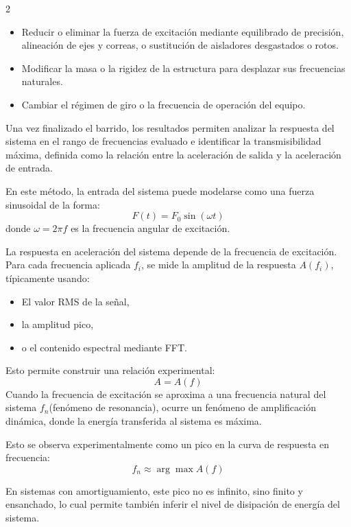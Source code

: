 \documentclass[10pt]{article}
\begin{document}
\begin{multicols}{2}
\begin{itemize}
    \item Reducir o eliminar la fuerza de excitación mediante equilibrado de precisión, alineación de ejes y correas, o sustitución de aisladores desgastados o rotos.
    \item Modificar la masa o la rigidez de la estructura para desplazar sus frecuencias naturales.
    \item Cambiar el régimen de giro o la frecuencia de operación del equipo.
\end{itemize}

Una vez finalizado el barrido, los resultados permiten analizar la respuesta del sistema en el rango de frecuencias evaluado e identificar la transmisibilidad máxima, definida como la relación entre la aceleración de salida y la aceleración de entrada.

En este método, la entrada del sistema puede modelarse como una fuerza sinusoidal de la forma:
\begin{equation}
F(t) = F_0 \sin(\omega t)
\end{equation}
donde $\omega = 2\pi f$ es la frecuencia angular de excitación.

La respuesta en aceleración del sistema depende de la frecuencia de excitación. Para cada frecuencia aplicada $f_i$, se mide la amplitud de la respuesta $A(f_i)$, típicamente usando:

\begin{itemize}
    \item El valor RMS de la señal,
    \item la amplitud pico,
    \item o el contenido espectral mediante FFT.
\end{itemize}

Esto permite construir una relación experimental:
\begin{equation}
A = A(f)
\end{equation}
Cuando la frecuencia de excitación se aproxima a una frecuencia natural  del sistema $f_n$(fenómeno de resonancia), ocurre un fenómeno de amplificación dinámica, donde la energía transferida al sistema es máxima. 

Esto se observa experimentalmente como un pico en la curva de respuesta en frecuencia:
\begin{equation}
f_n \approx \arg\max A(f)
\end{equation}

En sistemas con amortiguamiento, este pico no es infinito, sino finito y ensanchado, lo cual permite también inferir el nivel de disipación de energía del sistema.


\end{multicols}
\end{document}
